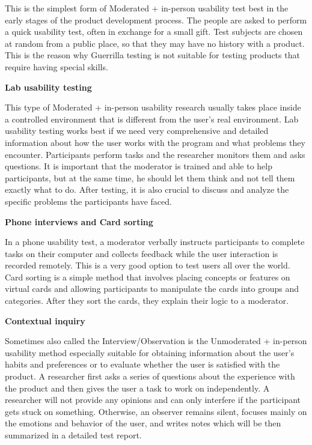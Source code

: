 \documentclass[a4paper,10pt,twoside]{article}
\begin{document}
\noindent This is the simplest form of Moderated + in-person usability
test best in the early stages of the product development process. The
people are asked to perform a quick usability test, often in exchange
for a small gift. Test subjects are chosen at random from a public
place, so that they may have no history with a product. This is the
reason why Guerrilla testing is not suitable for testing products that
require having special skills.

\smallskip

\noindent \textbf {Lab usability testing}

\noindent This type of Moderated + in-person usability research
usually takes place inside a controlled environment that is different
from the user’s real environment. Lab usability testing works best if
we need very comprehensive and detailed information about how the user
works with the program and what problems they encounter. Participants
perform tasks and the researcher monitors them and asks questions. It
is important that the moderator is trained and able to help
participants, but at the same time, he should let them think and not
tell them exactly what to do. After testing, it is also crucial to
discuss and analyze the specific problems the participants have faced.

\smallskip

\noindent \textbf {Phone interviews and Card sorting}

\noindent In a phone usability test, a moderator verbally instructs
participants to complete tasks on their computer and collects feedback
while the user interaction is recorded remotely. This is a very good
option to test users all over the world. Card sorting is a simple
method that involves placing concepts or features on virtual cards and
allowing participants to manipulate the cards into groups and
categories. After they sort the cards, they explain their logic to a
moderator.

\smallskip

\noindent \textbf {Contextual inquiry}

\noindent Sometimes also called the Interview/Observation is the
Unmoderated + in-person usability method especially suitable for
obtaining information about the user's habits and preferences or to
evaluate whether the user is satisfied with the product. A researcher
first asks a series of questions about the experience with the product
and then gives the user a task to work on independently. A researcher
will not provide any opinions and can only interfere if the
participant gets stuck on something. Otherwise, an observer remains
silent, focuses mainly on the emotions and behavior of the user, and
writes notes which will be then summarized in a detailed test report.
\end{document}
